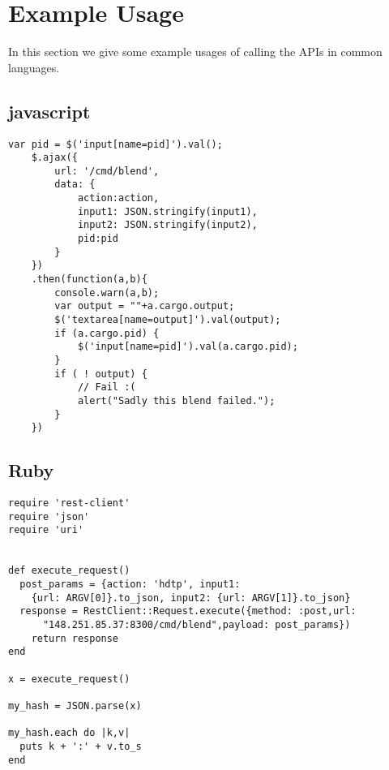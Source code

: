 \section{Example Usage} \label{sec:example}

In this section we give some example usages of calling the APIs in common languages.

\subsection{javascript}

\begin{verbatim}
var pid = $('input[name=pid]').val();
	$.ajax({
		url: '/cmd/blend',
		data: {
			action:action,
			input1: JSON.stringify(input1),
			input2: JSON.stringify(input2),
			pid:pid
		}
	})
	.then(function(a,b){
		console.warn(a,b);
		var output = ""+a.cargo.output;
		$('textarea[name=output]').val(output);
		if (a.cargo.pid) {
			$('input[name=pid]').val(a.cargo.pid);
		}
		if ( ! output) {
			// Fail :(
			alert("Sadly this blend failed.");
		}
	})
\end{verbatim}

\subsection{Ruby}

\begin{verbatim}
require 'rest-client'
require 'json'
require 'uri'


def execute_request()
  post_params = {action: 'hdtp', input1: 
    {url: ARGV[0]}.to_json, input2: {url: ARGV[1]}.to_json}
  response = RestClient::Request.execute({method: :post,url:
      "148.251.85.37:8300/cmd/blend",payload: post_params})
    return response
end

x = execute_request()

my_hash = JSON.parse(x)

my_hash.each do |k,v|
  puts k + ':' + v.to_s
end
\end{verbatim}